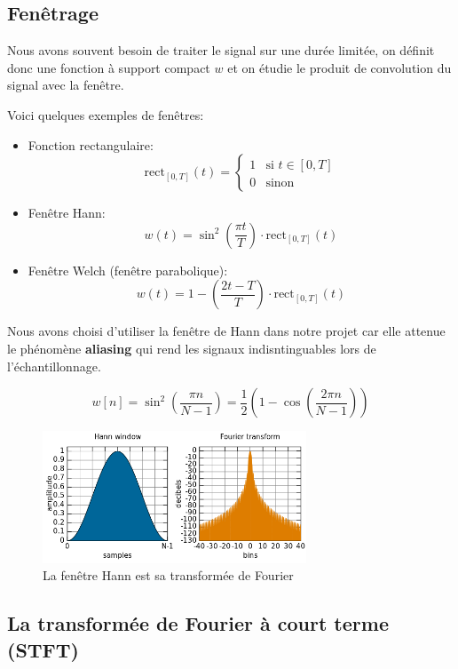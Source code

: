 \documentclass[]{article}
\providecommand{\tightlist}{%
  \setlength{\itemsep}{0pt}\setlength{\parskip}{0pt}}
\begin{document}
\hypertarget{fenetrage}{%
\subsection{Fenêtrage}\label{fenetrage}}

Nous avons souvent besoin de traiter le signal sur une durée limitée, on
définit donc une fonction à support compact \(w\) et on étudie le
produit de convolution du signal avec la fenêtre.

Voici quelques exemples de fenêtres:

\begin{itemize}
\tightlist
\item
  Fonction rectangulaire:
  \[ \mathrm{rect}_{[0,T]}(t) = \begin{cases} 1 &\text{si } t\in[0,T]\\0 &\text{sinon} \end{cases} \]
\item
  Fenêtre Hann:
  \[ w(t) = \sin^2 \left( \frac{\pi t}{T} \right) \cdot\mathrm{rect}_{[0,T]}(t) \]
\item
  Fenêtre Welch (fenêtre parabolique):
  \[ w(t) = 1 - \left( \frac{2t - T}{T} \right) \cdot\mathrm{rect}_{[0,T]}(t) \]
\end{itemize}

Nous avons choisi d'utiliser la fenêtre de Hann dans notre projet car
elle attenue le phénomène \textbf{aliasing} qui rend les signaux
indisntinguables lors de l'échantillonnage.

\[w[n] = \sin^2\left(\frac{\pi n}{N -1}\right)
    = \frac{1}{2}\left(1-\cos\left(\frac{2\pi n}{N -1}\right)\right)\]

\begin{figure}
\centering
\includegraphics[width=0.7\textwidth,height=\textheight]{img/Hann.png}
\caption{La fenêtre Hann est sa transformée de Fourier}
\end{figure}

\hypertarget{la-transformee-de-fourier-a-court-terme-stft}{%
\subsection{La transformée de Fourier à court terme
(STFT)}\label{la-transformee-de-fourier-a-court-terme-stft}}
\end{document}
